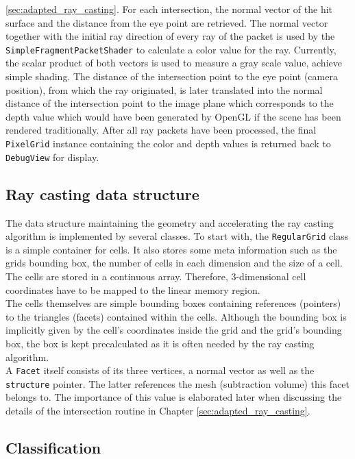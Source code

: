 \ref{sec:adapted_ray_casting}. For each intersection, the normal vector of the hit surface and the distance from the eye point are retrieved. The normal vector together with the initial ray direction of every ray of the packet is used by the \lstinline!SimpleFragmentPacketShader! to calculate a color value for the ray. Currently, the scalar product of both vectors is used to measure a gray scale value, achieve simple shading. The distance of the intersection point to the eye point (camera position), from which the ray originated, is later translated into the normal distance of the intersection point to the image plane which corresponds to the depth value which would have been generated by OpenGL if the scene has been rendered traditionally. After all ray packets have been processed, the final \lstinline!PixelGrid! instance containing the color and depth values is returned back to \lstinline!DebugView! for display.

\subsection{Ray casting data structure}
\label{sec:data_structure}

The data structure maintaining the geometry and accelerating the ray casting algorithm is implemented by several classes. To start with, the \lstinline!RegularGrid! class is a simple container for cells. It also stores some meta information such as the grids bounding box, the number of cells in each dimension and the size of a cell. The cells are stored in a continuous array. Therefore, 3-dimensional cell coordinates have to be mapped to the linear memory region. \\
The cells themselves are simple bounding boxes containing references (pointers) to the triangles (facets) contained within the cells. Although the bounding box is implicitly given by the cell's coordinates inside the grid and the grid's bounding box, the box is kept precalculated as it is often needed by the ray casting algorithm. \\
A \lstinline!Facet! itself consists of its three vertices, a normal vector as well as the \lstinline!structure! pointer. The latter references the mesh (subtraction volume) this facet belongs to. The importance of this value is elaborated later when discussing the details of the intersection routine in Chapter \ref{sec:adapted_ray_casting}.

\subsection{Classification}
\label{sec:classification}

